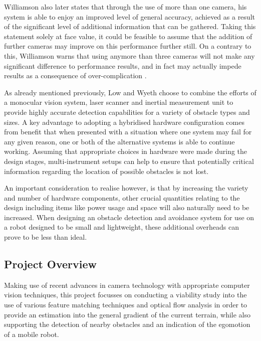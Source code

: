 Williamson also later states that through the use of more than one camera, his system is able to enjoy an improved level of general accuracy, achieved as a result of the significant level of additional information that can be gathered. Taking this statement solely at face value, it could be feasible to assume that the addition of further cameras may improve on this performance further still. On a contrary to this, Williamson warns that using anymore than three cameras will not make any significant difference to performance results, and in fact may actually impede results as a consequence of over-complication \cite{williamson}.

As already mentioned previously, Low and Wyeth \cite{low-wyeth} choose to combine the efforts of a monocular vision system, laser scanner and inertial measurement unit to provide highly accurate detection capabilities for a variety of obstacle types and sizes. A key advantage to adopting a hybridised hardware configuration comes from benefit that when presented with a situation where one system may fail for any given reason, one or both of the alternative systems is able to continue working. Assuming that appropriate choices in hardware were made during the design stages, multi-instrument setups can help to ensure that potentially critical information regarding the location of possible obstacles is not lost. 

An important consideration to realise however, is that by increasing the variety and number of hardware components, other crucial quantities relating to the design including items like power usage and space will also naturally need to be increased. When designing an obstacle detection and avoidance system for use on a robot designed to be small and lightweight, these additional overheads can prove to be less than ideal. 

\subsection{Project Overview}

Making use of recent advances in camera technology with appropriate computer vision techniques, this project focusses on conducting a viability study into the use of various feature matching techniques and optical flow analysis in order to provide an estimation into the general gradient of the current terrain, while also supporting the detection of nearby obstacles and an indication of the egomotion of a mobile robot. 



